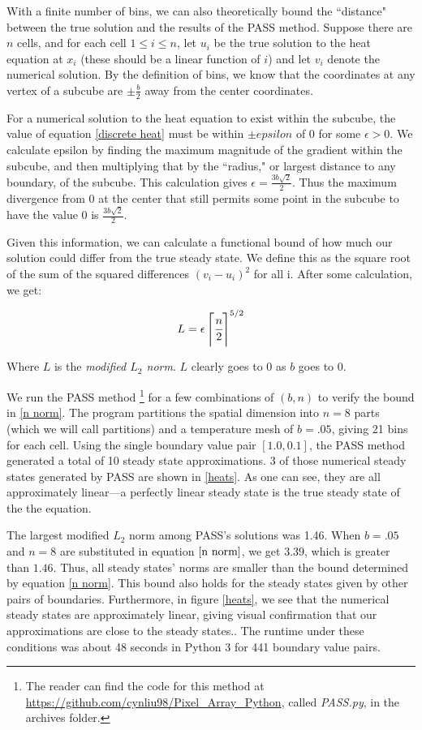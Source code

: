 \documentclass[11pt]{article}
\begin{document}
With a finite number of bins, we can also theoretically bound the ``distance" between the true solution and the results of the PASS method. Suppose there are $n$ cells, and for each cell $1\leq i\leq n$, let $u_i$ be the true solution to the heat equation at $x_i$ (these should be a linear function of $i$) and let $v_i$ denote the numerical solution. By the definition of bins, we know that the coordinates at any vertex of a subcube are $\pm \frac{b}{2}$ away from the center coordinates. 

For a numerical solution to the heat equation to exist within the subcube, the value of equation \cref{discrete heat} must be within $\pm epsilon$ of 0 for some $\epsilon > 0$. We calculate epsilon by finding the maximum magnitude of the gradient within the subcube, and then multiplying that by the ``radius," or largest distance to any boundary, of the subcube. This calculation gives $\epsilon = \frac{3b\sqrt{2}}{2}$. Thus the maximum divergence from 0 at the center that still permits some point in the subcube to have the value 0 is $\frac{3b\sqrt{2}}{2}$.

Given this information, we can calculate a functional bound of how much our solution could differ from the true steady state. We define this as the square root of the sum of the squared differences $(v_i-u_i)^2$ for all i. After some calculation, we get:

\begin{equation}
\label{n norm}
L = \epsilon \left \lceil \cfrac{n}{2} \right \rceil^{5/2}
\end{equation}

Where $L$ is the \emph{modified $L_2$ norm}. $L$ clearly goes to 0 as $b$ goes to 0. 

We run the PASS method%
\footnote{The reader can find the code for this method at \url{https://github.com/cynliu98/Pixel\_Array\_Python}, called \textit{PASS.py}, in the archives folder.}
for a few combinations of $(b,n)$ to verify the bound in \eqref{n norm}. The program partitions the spatial dimension into $n=8$ parts (which we will call partitions) and a temperature mesh of $b = .05$, giving 21 bins for each cell. Using the single boundary value pair $[1.0,0.1]$, the PASS method generated a total of 10 steady state approximations. 3 of those numerical steady states generated by PASS are shown in \cref{heats}. As one can see, they are all approximately linear---a perfectly linear steady state is the true steady state of the the equation.

The largest modified $L_2$ norm among PASS's solutions was 1.46. When $b = .05$ and $n = 8$ are substituted in equation $\cref{n norm}$, we get $3.39$, which is greater than $1.46$. Thus, all steady states' norms are smaller than the bound determined by equation \cref{n norm}. This bound also holds for the steady states given by other pairs of boundaries. Furthermore, in figure \cref{heats}, we see that the numerical steady states are approximately linear, giving visual confirmation that our approximations are close to the steady states.. The runtime under these conditions was about 48 seconds in Python 3 for 441 boundary value pairs. 
\end{document}

